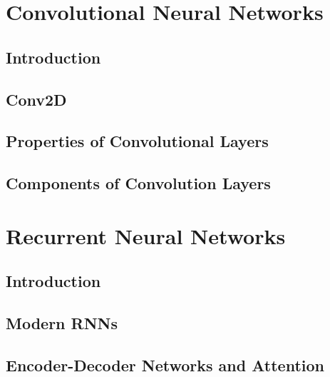 \documentclass[13pt,compress]{beamer}
\begin{document}
\section{Convolutional Neural Networks}
\subsection{Introduction}

\subsection{Conv2D}

\subsection{Properties of Convolutional Layers}

\subsection{Components of Convolution Layers}

\section{Recurrent Neural Networks}
\subsection{Introduction}



\subsection{Modern RNNs}

\subsection{Encoder-Decoder Networks and Attention}


\end{document}
